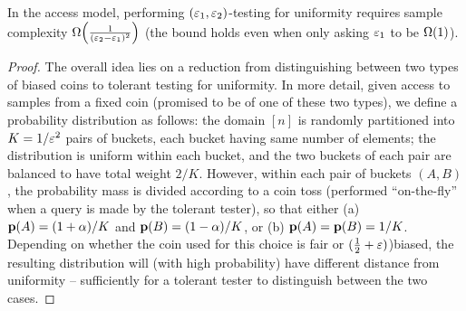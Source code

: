 \begin{theorem}\label{theorem:tolerant:tester:uniform:lb} In the \pdfsamp access model, performing $(\varepsilon_1, \varepsilon_2)$-testing for uniformity requires sample complexity $\bigOmega{\frac{1}{(\eps_2-\eps_1)^2}}$ (the bound holds even when only asking $\varepsilon_1$ to be $\bigOmega{1}$).
\end{theorem}
 \begin{proof}
The overall idea lies on a reduction from distinguishing between two types of biased coins to tolerant testing for uniformity. In more detail, given access to samples from a fixed coin (promised to be of one of these two types), we define a probability distribution as follows: the domain $[n]$ is randomly partitioned into $K=1/\varepsilon^2$ pairs of buckets, each bucket having same number of elements; the distribution is uniform within each bucket, and the two buckets of each pair are balanced to have total weight $2/K$. However, within each pair of buckets $(A,B)$, the probability mass is divided according to a coin toss (performed ``on-the-fly'' when a query is made by the tolerant tester), so that either \textsf{(a)} $\mathbf{p}(A)=(1+\alpha)/K$ and $\mathbf{p}(B)=(1-\alpha)/K$, or \textsf{(b)} $\mathbf{p}(A)=\mathbf{p}(B)=1/K$. Depending on whether the coin used for this choice is fair or $(\frac{1}{2}+\varepsilon)$)biased, the resulting distribution will (with high probability) have different distance from uniformity -- sufficiently for a tolerant tester to distinguish between the two cases.


\end{proof}
